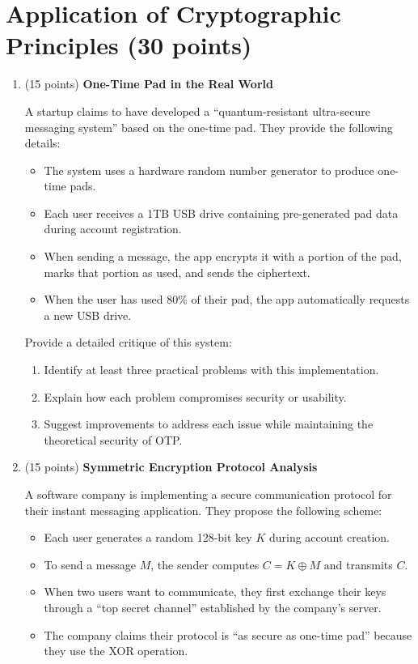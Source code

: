 \documentclass[10pt,a4paper,american]{exam}
\begin{document}
\section{Application of Cryptographic Principles (30 points)}

\begin{enumerate}
	\item (15 points) \textbf{One-Time Pad in the Real World}

	      A startup claims to have developed a ``quantum-resistant ultra-secure messaging system'' based on the one-time pad. They provide the following details:

	      \begin{itemize}
		      \item The system uses a hardware random number generator to produce one-time pads.
		      \item Each user receives a 1TB USB drive containing pre-generated pad data during account registration.
		      \item When sending a message, the app encrypts it with a portion of the pad, marks that portion as used, and sends the ciphertext.
		      \item When the user has used 80\% of their pad, the app automatically requests a new USB drive.
	      \end{itemize}

	      Provide a detailed critique of this system:
	      \begin{enumerate}
		      \item Identify at least three practical problems with this implementation.
		      \item Explain how each problem compromises security or usability.
		      \item Suggest improvements to address each issue while maintaining the theoretical security of OTP.
	      \end{enumerate}

	\item (15 points) \textbf{Symmetric Encryption Protocol Analysis}

	      A software company is implementing a secure communication protocol for their instant messaging application. They propose the following scheme:

	      \begin{itemize}
		      \item Each user generates a random 128-bit key $K$ during account creation.
		      \item To send a message $M$, the sender computes $C = K \oplus M$ and transmits $C$.
		      \item When two users want to communicate, they first exchange their keys through a ``top secret channel'' established by the company's server.
		      \item The company claims their protocol is ``as secure as one-time pad'' because they use the XOR operation.
	      \end{itemize}


\end{enumerate}
\end{document}

